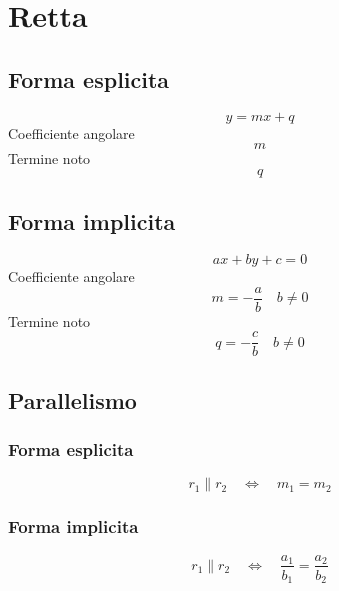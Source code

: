 \chapter{Retta}
\section{Forma esplicita}
\begin{equation*}
y=mx+q
\end{equation*}
Coefficiente angolare
\begin{equation*}
m
\end{equation*}
Termine noto
\begin{equation*}
q
\end{equation*}
\section{Forma implicita}
\begin{equation*}
ax+by+c=0
\end{equation*}
Coefficiente angolare
\begin{equation*}
m=-\dfrac{a}{b}\quad b\neq 0
\end{equation*}
Termine noto
\begin{equation*}
q=-\dfrac{c}{b}\quad b\neq 0
\end{equation*}
\section{Parallelismo}
\subsection{Forma esplicita}
\begin{equation*}
r_1\parallel r_2\quad\Longleftrightarrow\quad	m_1=m_2
\end{equation*}
\subsection{Forma implicita}
\begin{equation*}
r_1\parallel r_2\quad\Longleftrightarrow\quad \dfrac{a_1}{b_1}=\dfrac{a_2}{b_2}
\end{equation*}

